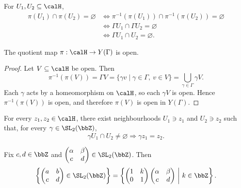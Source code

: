 \begin{remark}\label{Rem:MF_quotient_disjoint}
    For $U_1, U_2 \subseteq \calH$,
    \[
        \begin{aligned}
            \pi(U_1) \cap \pi(U_2) = \varnothing &\Longleftrightarrow \pi^{-1}(\pi(U_1)) \cap \pi^{-1}(\pi(U_2)) = \varnothing\\
            &\Longleftrightarrow \Gamma U_1 \cap \Gamma U_2 = \varnothing\\
            &\Longleftrightarrow \Gamma U_1 \cap U_2 = \varnothing.
        \end{aligned}
    \]
\end{remark}

\begin{proposition}\label{Prop:MF_quotient_open}
    The quotient map $\pi : \calH \to Y(\Gamma)$ is open.
\end{proposition}

\begin{proof}
    Let $V \subseteq \calH$ be open. Then
    \[
        \pi^{-1}(\pi(V)) = \Gamma V = \{\gamma v \mid \gamma \in \Gamma,\ v \in V\} = \bigcup_{\gamma \in \Gamma}\gamma V.
    \]
    Each $\gamma$ acts by a homeomorphism on $\calH$, so each $\gamma V$ is open. Hence $\pi^{-1}(\pi(V))$ is open, and therefore $\pi(V)$ is open in $Y(\Gamma)$.
\end{proof}

\begin{proposition}\label{Prop:MF_orbit_neighbourhoods}
    For every $z_1, z_2 \in \calH$, there exist neighbourhoods $U_1 \ni z_1$ and $U_2 \ni z_2$ such that, for every $\gamma \in \SL_2(\bbZ)$,
    \[
        \gamma U_1 \cap U_2 \neq \varnothing \Longrightarrow \gamma z_1 = z_2.
    \]
\end{proposition}

\begin{lemma}\label{Lem:MF_fixed_bottom_row}
    Fix $c, d \in \bbZ$ and $\begin{pmatrix}\alpha & \beta\\ c & d\end{pmatrix} \in \SL_2(\bbZ)$. Then
    \[
        \left\{\begin{pmatrix}a & b\\ c & d\end{pmatrix} \in \SL_2(\bbZ)\right\} = \left\{\begin{pmatrix}1 & k\\ 0 & 1\end{pmatrix}\begin{pmatrix}\alpha & \beta\\ c & d\end{pmatrix} \ \middle|\ k \in \bbZ\right\}.
    \]
\end{lemma}

